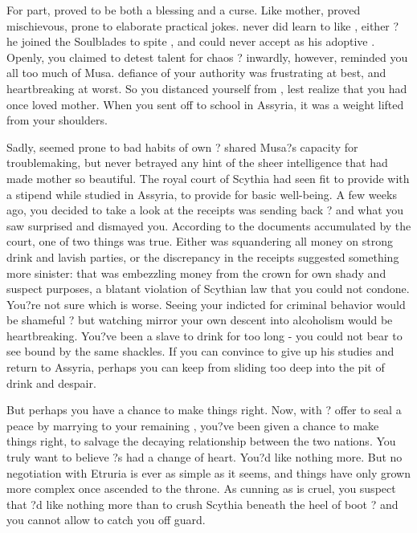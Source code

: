 \documentclass[char]{Kos}
\begin{document}
    For \cWard{\their} part, \cWard{} proved to be both a blessing and a curse. Like \cWard{\their} mother, \cWard{\they} proved mischievous, prone to elaborate practical jokes. \cWard{\They} never did learn to like \cScythiaQueen{}, either ? he joined the Soulblades to spite \cScythiaQueen{\them}, and could never accept \cScythiaQueen{\them} as his adoptive \cScythiaQueen{\parent}. Openly, you claimed to detest \cWard{\their} talent for chaos ? inwardly, however, \cWard{\they} reminded you all too much of Musa. \cWard{\Their} defiance of your authority was frustrating at best, and heartbreaking at worst. So you distanced yourself from \cWard{\them}, lest \cScythiaQueen{} realize that you had once loved \cWard{\their} mother. When you sent \cWard{} off to school in Assyria, it was a weight lifted from your shoulders.

    Sadly, \cWard{} seemed prone to bad habits of \cWard{\their} own ? \cWard{\they} shared Musa?s capacity for troublemaking, but never betrayed any hint of the sheer intelligence that had made \cWard{\their} mother so beautiful. The royal court of Scythia had seen fit to provide  with a stipend while \cWard{\they} studied in Assyria, to provide for \cWard{\their} basic well-being. A few weeks ago, you decided to take a look at the receipts \cWard{} was sending back ? and what you saw surprised and dismayed you. According to the documents accumulated by the court, one of two things was true. Either \cWard{} was squandering all \cWard{\their} money on strong drink and lavish parties, or the discrepancy in the receipts suggested something more sinister: that \cWard{\they} was embezzling money from the crown for \cWard{\their} own shady and suspect purposes, a blatant violation of Scythian law that you could not condone. You?re not sure which is worse. Seeing your \cWard{\offspring} indicted for criminal behavior would be shameful ? but watching \cWard{\them} mirror your own descent into alcoholism would be heartbreaking. You?ve been a slave to drink for too long - you could not bear to see \cWard{\them} bound by the same shackles. If you can convince \cWard{\them} to give up his studies and return to Assyria, perhaps you can keep \cWard{\them} from sliding too deep into the pit of drink and despair.

    But perhaps you have a chance to make things right. Now, with \cEtruriaKing{\Monarch} \cEtruriaKing{}? offer to seal a peace by marrying \cEtruriaKing{\their} \cGroom{\offspring} \cGroom{} to your remaining \cBride{\offspring} \cBride{}, you?ve been given a chance to make things right, to salvage the decaying relationship between the two nations. You truly want to believe \cEtruriaKing{\they}?s had a change of heart. You?d like nothing more. But no negotiation with Etruria is ever as simple as it seems, and things have only grown more complex once \cEtruriaKing{} ascended to the throne. As cunning as \cEtruriaKing{\they} is cruel, you suspect that \cEtruriaKing{\they}?d like nothing more than to crush Scythia beneath the heel of \cEtruriaKing{\their} boot ? and you cannot allow \cEtruriaKing{\them} to catch you off guard. 
\end{document}
